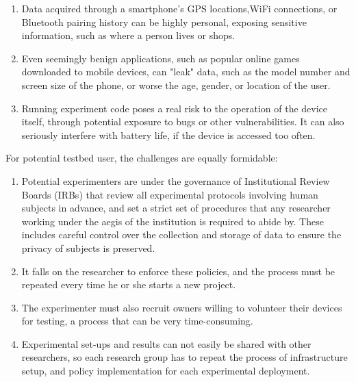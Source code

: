 \begin{enumerate}
\item Data acquired through a smartphone's GPS locations,WiFi
connections, or Bluetooth pairing history can be highly personal,
exposing sensitive information, such as where a person lives or shops\cite{han2012accomplice}.

\item  Even seemingly benign applications, such as popular online games downloaded to mobile devices, can
 "leak" data, such as the model number and screen size of the phone, or worse the age, gender, or location of the user. 

\item Running experiment code poses a real risk to the operation of the device itself, through potential exposure to bugs or other 
vulnerabilities. It can also seriously interfere with battery life, if the device is accessed too often.
\end{enumerate}

For potential testbed user, the challenges are equally formidable:
\begin{enumerate}
\item Potential experimenters are under the governance of Institutional Review Boards (IRBs) that
review all experimental protocols involving human subjects in advance,
and set a strict set of procedures that any researcher working under
the aegis of the institution is required to abide by. These includes
careful control over the collection and storage of data to ensure the privacy of subjects is preserved.

\item  It falls on the researcher to enforce these policies, and the
process must be repeated every time he or she starts a new project.

\item The experimenter must also recruit owners willing to volunteer their devices for testing, a process that can be very time-consuming.

\item Experimental set-ups and results can not easily be shared with other researchers, so each research group has to repeat the process
of infrastructure setup, and policy implementation for
each experimental deployment.
\end{enumerate}

